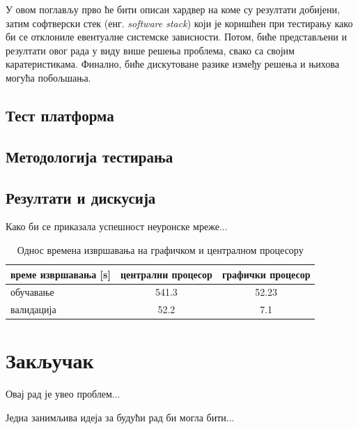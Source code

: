 \documentclass[a4paper, 12pt, master, utf8]{etf}
\begin{document}
У овом поглављу прво ће бити описан хардвер на коме су резултати добијени, затим софтверски стек (енг. \textit{software stack}) који је коришћен при тестирању како би се отклониле евентуалне системске зависности. Потом, биће представљени и резултати овог рада у виду више решења проблема, свако са својим каратеристикама. Финално, биће дискутоване разике између решења и њихова могућа побољшања. 

\section{Тест платформа}
\label{sec:51}

\section{Методологија тестирања}
\label{sec:52}

\section{Резултати и дискусија}
\label{sec:53}

Како би се приказала успешност неуронске мреже...

\begin{table}[h]
    \centering
    \begin{tabular}{l | c c}
    \hline
    време извршавања [s] & централни процесор & графички процесор\\
    \hline
        обучавање & 541.3  & 52.23\\
        валидација & 52.2 & 7.1
    \end{tabular}
    \caption{Однос времена извршавања на графичком и централном процесору}
    \label{tab:performanse}
\end{table}

\chapter{Закључак }
\label{sec:6}

Овај рад је увео проблем...

Једна занимљива идеја за будући рад би могла бити...





\end{document}
